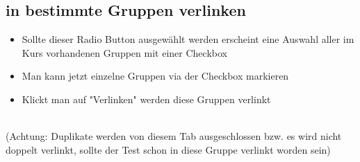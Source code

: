 \subsection*{in bestimmte Gruppen verlinken}
\begin{itemize}
	\item Sollte dieser Radio Button ausgewählt werden erscheint eine Auswahl aller im Kurs vorhandenen Gruppen mit einer Checkbox
	\item Man kann jetzt einzelne Gruppen via der Checkbox markieren
	\item Klickt man auf "Verlinken" werden diese Gruppen verlinkt
\end{itemize}

~\\(Achtung: Duplikate werden von diesem Tab ausgeschlossen bzw. es wird nicht doppelt verlinkt, sollte der Test schon in diese Gruppe verlinkt worden sein) 
\clearpage